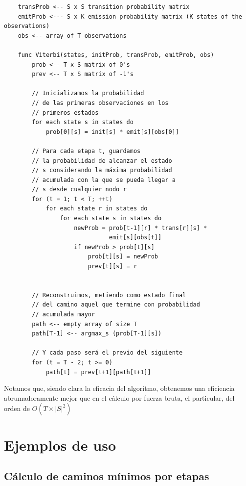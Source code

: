 \documentclass{article}
\begin{document}
\begin{minipage}{0.9\textwidth}
\begin{verbatim}
    transProb <-- S x S transition probability matrix
    emitProb <--- S x K emission probability matrix (K states of the observations)
    obs <-- array of T observations

    func Viterbi(states, initProb, transProb, emitProb, obs)
        prob <-- T x S matrix of 0's
        prev <-- T x S matrix of -1's

        // Inicializamos la probabilidad
        // de las primeras observaciones en los
        // primeros estados
        for each state s in states do
            prob[0][s] = init[s] * emit[s][obs[0]]
	
        // Para cada etapa t, guardamos
        // la probabilidad de alcanzar el estado 
        // s considerando la máxima probabilidad 
        // acumulada con la que se pueda llegar a
        // s desde cualquier nodo r
        for (t = 1; t < T; ++t) 
            for each state r in states do
                for each state s in states do
                    newProb = prob[t-1][r] * trans[r][s] *
                              emit[s][obs[t]]
                    if newProb > prob[t][s]
                        prob[t][s] = newProb
                        prev[t][s] = r
	

        // Reconstruimos, metiendo como estado final
        // del camino aquel que termine con probabilidad
        // acumulada mayor
        path <-- empty array of size T
        path[T-1] <-- argmax_s (prob[T-1][s])

        // Y cada paso será el previo del siguiente
        for (t = T - 2; t >= 0)
            path[t] = prev[t+1][path[t+1]] 
\end{verbatim}
\end{minipage}

\medskip

Notamos que, siendo clara la eficacia del algoritmo, 
obtenemos una eficiencia abrumadoramente mejor que en 
el cálculo por fuerza bruta, el particular, 
del orden de $O(T \times \left|S\right|^{2})$

\newpage

\section{Ejemplos de uso}

\subsection{Cálculo de caminos mínimos por etapas}
\end{document}
